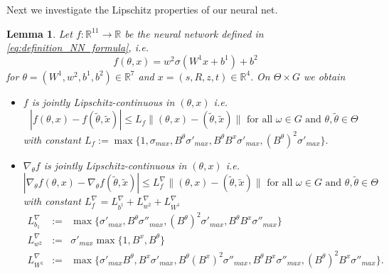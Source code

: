 \documentclass[reqno, 11pt]{amsart}%
\newcommand\RR{\mathbb R}
\newtheorem{lemma}[theorem]{Lemma}
\theoremstyle{definition}
\begin{document}
Next we investigate the Lipschitz properties of our neural net. 
\begin{lemma}\label{lem:NNLipschitz}
Let $f : \RR^{11}\to \RR$ be the neural network defined in \eqref{eq:definition_NN_formula}, i.e.
$$ f(\theta,x) = w^2 \sigma(W^1 x+b^1)+b^2$$
for $\theta=(W^1,w^2,b^1,b^2)\in \RR^7$ and $x=(s,R,z,t)\in\RR^4.$ 
On $\Theta\times G$ we obtain
\begin{itemize}
\item[a)] $f$ is jointly  Lipschitz-continuous in $(\theta,x)$ i.e.
$$|f(\theta,x)-f(\tilde\theta,\tilde x)| \le L_f \|(\theta,x)-(\tilde\theta,\tilde x)\| \mbox{ for all } \omega \in G \mbox{ and } \theta,\tilde\theta\in\Theta$$ with constant
$L_f := \max\{ 1, \sigma_{max}, B^{\theta}\sigma'_{max} ,B^{\theta} B^{x} \sigma'_{max}, (B^\theta)^2 \sigma'_{max}\}. $
\item[b)] $\nabla_\theta f$ is jointly  Lipschitz-continuous in $(\theta,x)$  i.e.
$$|\nabla_\theta f(\theta,x)-\nabla_\theta f(\tilde\theta,\tilde x)| \le L_f^\nabla \|(\theta,x)-(\tilde\theta,\tilde x)\| \mbox{ for all } \omega \in G \mbox{ and } \theta,\tilde\theta\in\Theta$$
with constant $L_f^\nabla = L_{b^1}^\nabla+L_{w^2}^\nabla+L_{W^1}^\nabla$
\begin{eqnarray*}
    L_{b_1}^\nabla & :=& \max\{\sigma'_{max},  B^{\theta}\sigma''_{max},  (B^\theta)^2\sigma'_{max}, B^{\theta} B^{x} \sigma''_{max}\}\\
     L_{w^2}^\nabla & :=& \sigma'_{max} \max\{ 1,B^x, B^{\theta}\}\\
 L_{W^1}^\nabla & :=& \max\{\sigma'_{max} B^\theta,  B^x  \sigma'_{max}, B^{\theta} (B^{x})^2\sigma''_{max},  B^{\theta} B^{x} \sigma''_{max},  (B^{\theta})^2 B^{x} \sigma''_{max}\}.
\end{eqnarray*}
\end{itemize}
\end{lemma}
\end{document}
